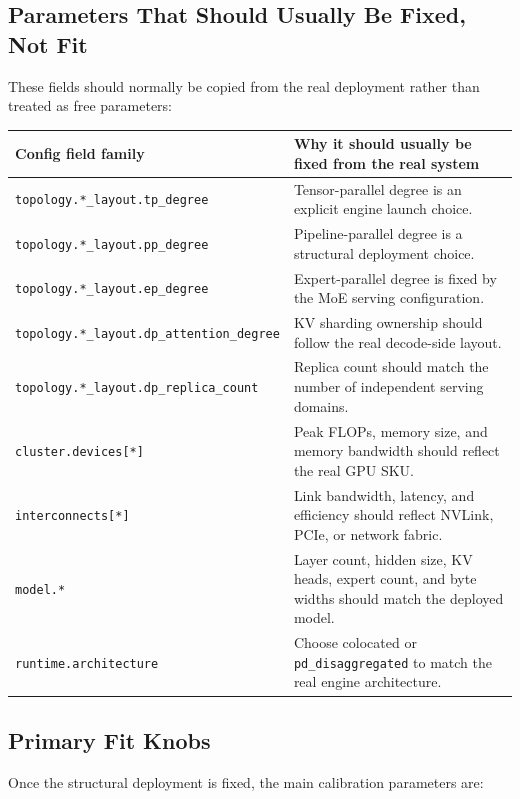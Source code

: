 \subsection{Parameters That Should Usually Be Fixed, Not Fit}

These fields should normally be copied from the real deployment rather than
treated as free parameters:

\begin{longtable}{p{} p{}}
\toprule
Config field family & Why it should usually be fixed from the real system \\
\midrule
\endhead
\texttt{topology.*\_layout.tp\_degree} &
Tensor-parallel degree is an explicit engine launch choice. \\
\texttt{topology.*\_layout.pp\_degree} &
Pipeline-parallel degree is a structural deployment choice. \\
\texttt{topology.*\_layout.ep\_degree} &
Expert-parallel degree is fixed by the MoE serving configuration. \\
\texttt{topology.*\_layout.dp\_attention\_degree} &
KV sharding ownership should follow the real decode-side layout. \\
\texttt{topology.*\_layout.dp\_replica\_count} &
Replica count should match the number of independent serving domains. \\
\texttt{cluster.devices[*]} &
Peak FLOPs, memory size, and memory bandwidth should reflect the real GPU SKU. \\
\texttt{interconnects[*]} &
Link bandwidth, latency, and efficiency should reflect NVLink, PCIe, or network fabric. \\
\texttt{model.*} &
Layer count, hidden size, KV heads, expert count, and byte widths should match the deployed model. \\
\texttt{runtime.architecture} &
Choose colocated or \texttt{pd\_disaggregated} to match the real engine architecture. \\
\bottomrule
\end{longtable}

\subsection{Primary Fit Knobs}

Once the structural deployment is fixed, the main calibration parameters are:

